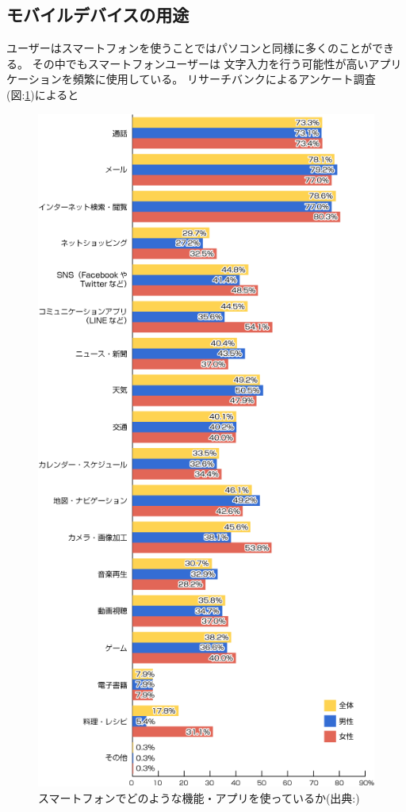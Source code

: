 \subsection{モバイルデバイスの用途}
ユーザーはスマートフォンを使うことではパソコンと同様に多くのことができる。
その中でもスマートフォンユーザーは
文字入力を行う可能性が高いアプリケーションを頻繁に使用している。
リサーチバンクによるアンケート調査\cite{researchbanksmartphone}
(図:\ref{fig:purpose})によると
\begin{figure}[htbp]
  \begin{center}
    \includegraphics[width=115mm,bb=0 0 500 1001]{images/purpose.png}
    \caption{スマートフォンでどのような機能・アプリを使っているか(出典:\cite{researchbanksmartphone})}
    \label{fig:purpose}
  \end{center}
\end{figure}
